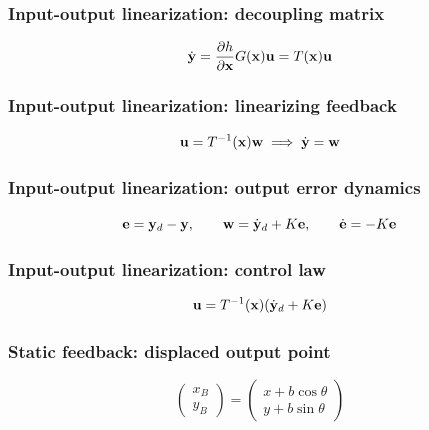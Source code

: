 \subsubsection{Input-output linearization: decoupling matrix}
\begin{equation*}
    {\dot{\mathbf y}}=\frac{\partial h}{\partial\mathbf x}G(\mathbf x)\mathbf u=T(\mathbf x)\mathbf u
\end{equation*}

\subsubsection{Input-output linearization: linearizing feedback}
\begin{equation*}
    \mathbf u=T^{-1}(\mathbf x)\mathbf w\implies{\dot{\mathbf y}}=\mathbf w
\end{equation*}

\subsubsection{Input-output linearization: output error dynamics}
\begin{equation*}
    \mathbf e={\mathbf y}_d-{\mathbf y},\qquad\mathbf w={\dot{\mathbf y}}_d+K\mathbf e,\qquad\dot{\mathbf e}=-K\mathbf e
\end{equation*}

\subsubsection{Input-output linearization: control law}
\begin{equation*}
    \mathbf u=T^{-1}(\mathbf x)({\dot{\mathbf y}}_d+K\mathbf e)
\end{equation*}

\subsubsection{Static feedback: displaced output point}
\begin{equation*}
    \begin{pmatrix}x_B\\y_B\end{pmatrix}=\begin{pmatrix}x+b\cos\theta\\y+b\sin\theta\end{pmatrix}
\end{equation*}

